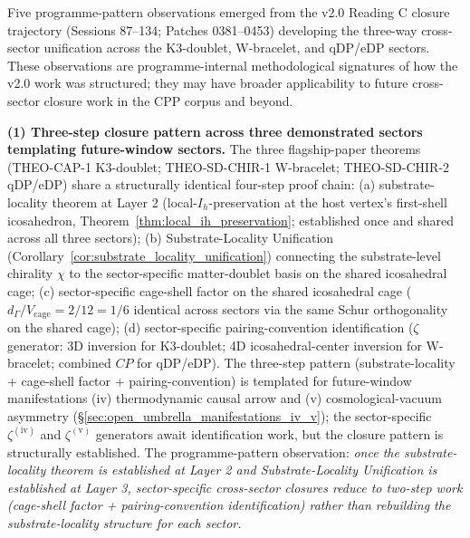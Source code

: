 \documentclass[11pt,letterpaper]{article}
\begin{document}
Five programme-pattern observations emerged from the v2.0 Reading C closure trajectory (Sessions 87--134; Patches 0381--0453) developing the three-way cross-sector unification across the K3-doublet, W-bracelet, and qDP/eDP sectors. These observations are programme-internal methodological signatures of how the v2.0 work was structured; they may have broader applicability to future cross-sector closure work in the CPP corpus and beyond.

\textbf{(1) Three-step closure pattern across three demonstrated sectors templating future-window sectors.} The three flagship-paper theorems (THEO-CAP-1 K3-doublet; THEO-SD-CHIR-1 W-bracelet; THEO-SD-CHIR-2 qDP/eDP) share a structurally identical four-step proof chain: (a) substrate-locality theorem at Layer 2 (local-$I_h$-preservation at the host vertex's first-shell icosahedron, Theorem~\ref{thm:local_ih_preservation}; established once and shared across all three sectors); (b) Substrate-Locality Unification (Corollary~\ref{cor:substrate_locality_unification}) connecting the substrate-level chirality $\chi$ to the sector-specific matter-doublet basis on the shared icosahedral cage; (c) sector-specific cage-shell factor on the shared icosahedral cage ($d_\Gamma/V_{\text{cage}} = 2/12 = 1/6$ identical across sectors via the same Schur orthogonality on the shared cage); (d) sector-specific pairing-convention identification ($\zeta$ generator: 3D inversion for K3-doublet; 4D icosahedral-center inversion for W-bracelet; combined $CP$ for qDP/eDP). The three-step pattern (substrate-locality + cage-shell factor + pairing-convention) is templated for future-window manifestations (iv) thermodynamic causal arrow and (v) cosmological-vacuum asymmetry (\S\ref{sec:open_umbrella_manifestations_iv_v}); the sector-specific $\zeta^{(\text{iv})}$ and $\zeta^{(\text{v})}$ generators await identification work, but the closure pattern is structurally established. The programme-pattern observation: \emph{once the substrate-locality theorem is established at Layer 2 and Substrate-Locality Unification is established at Layer 3, sector-specific cross-sector closures reduce to two-step work (cage-shell factor + pairing-convention identification) rather than rebuilding the substrate-locality structure for each sector.}
\end{document}
